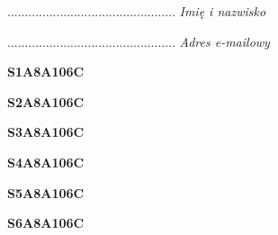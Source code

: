 \begin{turn}{90}\begin{minipage}{\linewidth} \vspace{20mm} ................................................  \textit{Imię i nazwisko}\end{minipage}\end{turn}

\begin{turn}{90}\begin{minipage}{\linewidth} \vspace{20mm} ................................................  \textit{Adres e-mailowy}\end{minipage}\end{turn}

\begin{turn}{90}\huge \begin{minipage}{\linewidth} \vspace{10mm}\textbf{S1A8A106C}\end{minipage}\end{turn}

\begin{turn}{90}\huge \begin{minipage}{\linewidth} \vspace{10mm}\textbf{S2A8A106C}\end{minipage}\end{turn}

\begin{turn}{90}\huge \begin{minipage}{\linewidth} \vspace{10mm}\textbf{S3A8A106C}\end{minipage}\end{turn}

\begin{turn}{90}\huge \begin{minipage}{\linewidth} \vspace{10mm}\textbf{S4A8A106C}\end{minipage}\end{turn}

\begin{turn}{90}\huge \begin{minipage}{\linewidth} \vspace{10mm}\textbf{S5A8A106C}\end{minipage}\end{turn}

\begin{turn}{90}\huge \begin{minipage}{\linewidth} \vspace{10mm}\textbf{S6A8A106C}\end{minipage}\end{turn}

